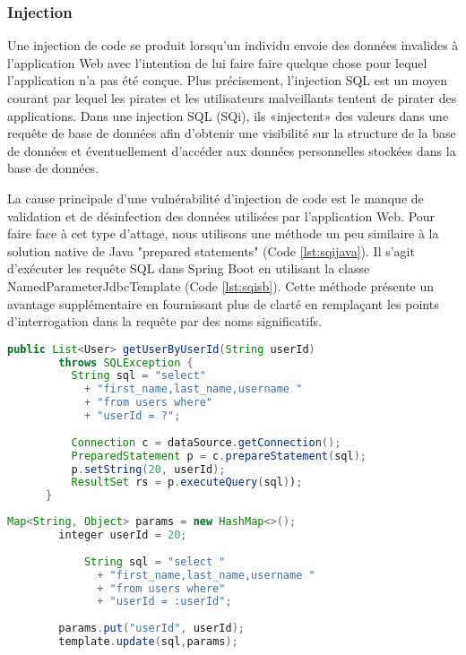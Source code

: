     \subsubsection{Injection}
    Une injection de code se produit lorsqu'un individu envoie des données 
    invalides à l'application Web avec l'intention de lui faire faire quelque 
    chose pour lequel l'application n'a pas été conçue. Plus précisement,
    l'injection SQL est un moyen courant par lequel les pirates et les 
    utilisateurs malveillants tentent de pirater des applications. Dans une 
    injection SQL (SQi), ils «injectent» des valeurs dans une requête de base de 
    données afin d’obtenir une visibilité sur la structure de la base de 
    données et éventuellement d’accéder aux données personnelles stockées 
    dans la base de données.
    \par 
    La cause principale d'une vulnérabilité d'injection de code est le manque 
    de validation et de désinfection des données utilisées par l'application Web.
    Pour faire face à cet type d'attage, nous utilisons une méthode un peu similaire
    à la solution native de Java "prepared statements" (Code \ref{lst:sqijava}). Il s'agit d'exécuter les 
    requête SQL dans Spring Boot en utilisant la classe NamedParameterJdbcTemplate (Code \ref{lst:sqisb}). 
    Cette méthode présente un avantage supplémentaire en fournissant plus de clarté en 
    remplaçant les points d'interrogation dans la requête par des noms significatifs.
    \begin{lstlisting}[caption={Éviter SQi en Java: Prepared statements},label={lst:sqijava},language=Java]
        public List<User> getUserByUserId(String userId)
        throws SQLException {    
          String sql = "select"
            + "first_name,last_name,username "
            + "from users where"
            + "userId = ?";
          
          Connection c = dataSource.getConnection();
          PreparedStatement p = c.prepareStatement(sql);
          p.setString(20, userId);
          ResultSet rs = p.executeQuery(sql)); 
      }
    \end{lstlisting}

    \begin{lstlisting}[caption={Éviter SQi avec Spring Boot: NamedParameterJdbcTemplate},label={lst:sqisb},language=Java]
        Map<String, Object> params = new HashMap<>();
        integer userId = 20;
        
            String sql = "select "
              + "first_name,last_name,username "
              + "from users where"
              + "userId = :userId";
        
        params.put("userId", userId);
        template.update(sql,params);
    \end{lstlisting}